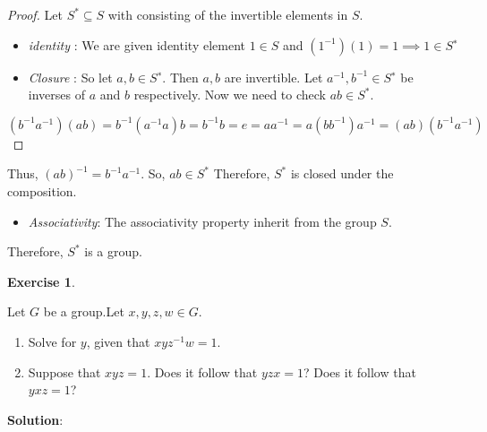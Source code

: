 \documentclass[
]{book}
\providecommand{\tightlist}{%
  \setlength{\itemsep}{0pt}\setlength{\parskip}{0pt}}
\theoremstyle{definition}
\theoremstyle{definition}
\theoremstyle{definition}
\newtheorem{exercise}{Exercise}[chapter]
\theoremstyle{definition}
\theoremstyle{remark}
\begin{document}
\begin{proof}
Let \(S^*\subseteq S\) with consisting of the invertible elements in \(S\).

\begin{itemize}
\item
  \emph{identity} : We are given identity element \(1 \in S\) and \((1^{−1})(1)=1 \implies 1 \in S^∗\)
\item
  \emph{Closure} :
  So let \(a,b\in S^∗\). Then \(a,b\) are invertible. Let \(a^{−1},b^{−1}\in S^∗\) be inverses of \(a\) and \(b\) respectively. Now we need to check \(ab\in S^*\).\\
\end{itemize}

\[(b^{−1}a^{−1})(ab)=b^{−1}(a^{−1}a)b=b^{−1}b=e=
  aa^{-1}=a(bb^{−1})a^{−1}=(ab)(b^{−1}a^{−1})\]
\end{proof}

Thus, \((ab)^{−1}=b^{−1}a^{−1}\). So, \(ab\in S^*\)
Therefore, \(S^*\) is closed under the composition.

\begin{itemize}
\tightlist
\item
  \emph{Associativity}: The associativity property inherit from the group \(S\).
\end{itemize}

Therefore, \(S^*\) is a group.

\begin{exercise}
\protect\hypertarget{exr:unnamed-chunk-49}{}\label{exr:unnamed-chunk-49}

Let \(G\) be a group.Let \(x, y, z,w \in G\).

\begin{enumerate}
\def\labelenumi{(\alph{enumi})}
\tightlist
\item
  Solve for \(y\), given that \(xyz^{-1}w = 1\).
\item
  Suppose that \(xyz = 1\). Does it follow that \(yzx = 1\)? Does it follow that \(yxz = 1\)?
\end{enumerate}

\end{exercise}

\textbf{Solution}:
\end{document}
